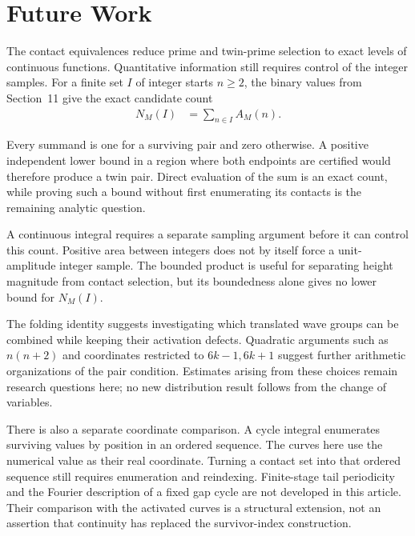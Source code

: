 \section{Future Work}
The contact equivalences reduce prime and twin-prime selection to exact
levels of continuous functions. Quantitative information still requires
control of the integer samples. For a finite set $I$ of integer starts
$n\ge2$, the binary values from Section~11 give the exact candidate count
\begin{equation*}
\begin{aligned}
N_M(I)&=\sum_{n\in I}A_M(n).
\end{aligned}
\end{equation*}

Every summand is one for a surviving pair and zero otherwise. A positive
independent lower bound in a region where both endpoints are certified would
therefore produce a twin pair. Direct evaluation of the sum is an exact
count, while proving such a bound without first enumerating its contacts is
the remaining analytic question.

A continuous integral requires a separate sampling argument before it can
control this count. Positive area between integers does not by itself force
a unit-amplitude integer sample. The bounded product is useful for separating
height magnitude from contact selection, but its boundedness alone gives no
lower bound for $N_M(I)$.

The folding identity suggests investigating which translated wave groups can
be combined while keeping their activation defects. Quadratic arguments such
as $n(n+2)$ and coordinates restricted to $6k-1,6k+1$ suggest further
arithmetic organizations of the pair condition. Estimates arising from these
choices remain research questions here; no new distribution result follows
from the change of variables.

There is also a separate coordinate comparison. A cycle integral enumerates
surviving values by position in an ordered sequence. The curves here use the
numerical value as their real coordinate. Turning a contact set into that
ordered sequence still requires enumeration and reindexing. Finite-stage
tail periodicity and the Fourier description of a fixed gap cycle are not
developed in this article. Their comparison with the activated curves is a
structural extension, not an assertion that continuity has replaced the
survivor-index construction.
